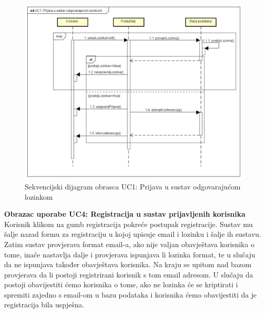 				\begin{figure}[H]
					\includegraphics[width=\textwidth]{slike/uc1Sekvencijski.PNG} %
					\caption{Sekvencijski dijagram obrasca UC1: Prijava u sustav odgovarajućom lozinkom}
					\label{fig:uc1-sekvencijski} %
				\end{figure}
				\eject
					\textbf{Obrazac uporabe UC4: Registracija u sustav prijavljenih korisnika}\\
				Korisnik klikom na gumb registracija pokreće postupak registracije. Sustav mu šalje nazad formu za registraciju u kojoj upisuje email i lozinku i šalje ih sustavu. Zatim sustav provjerava format email-a, ako nije valjan obavještava korisnika o tome, inače nastavlja dalje i provjerava ispunjava li lozinka format, te u slučaju da ne ispunjava također obavještava korisnika. Na kraju se upitom nad bazom provjerava da li postoji registrirani korisnik s tom email adresom. U slučaju da postoji obavijestiti ćemo korisnika o tome, ako ne lozinka će se kriptirati i spremiti zajedno s email-om u bazu podataka i korisnika ćemo obavijestiti da je registracija bila uspješna.
				
